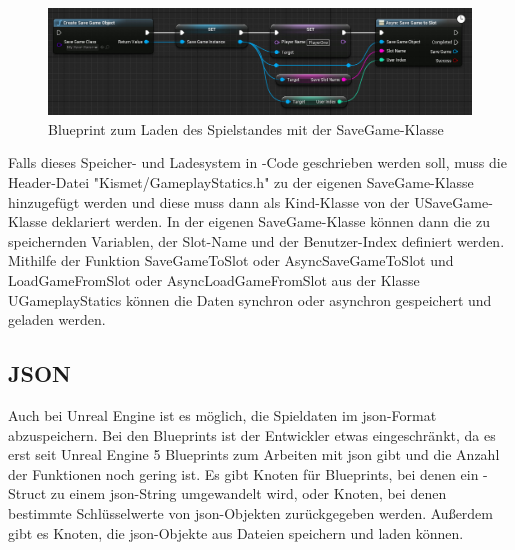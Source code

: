 \begin{figure}[htp]
    \centering
    \includegraphics[width=1\textwidth]{images/SaveGameBP.png}
    \caption{Blueprint zum Laden des Spielstandes mit der SaveGame-Klasse \cite{unrealengineSavingLoading}}
    \label{fig:unrealSaveGameBluePrintLoad}
\end{figure}

Falls dieses Speicher- und Ladesystem in \cpp{}-Code geschrieben werden soll, muss die Header-Datei "Kismet/GameplayStatics.h" zu der eigenen SaveGame-Klasse hinzugefügt werden und diese muss dann als Kind-Klasse von der USaveGame-Klasse deklariert werden. In der eigenen SaveGame-Klasse können dann die zu speichernden Variablen, der Slot-Name und der Benutzer-Index definiert werden. Mithilfe der Funktion SaveGameToSlot oder AsyncSaveGameToSlot und LoadGameFromSlot oder AsyncLoadGameFromSlot aus der Klasse UGameplayStatics können die Daten synchron oder asynchron gespeichert und geladen werden.\cite{unrealengineSavingLoading}



\subsection{JSON}
Auch bei Unreal Engine ist es möglich, die Spieldaten im \ac{json}-Format abzuspeichern. Bei den Blueprints ist der Entwickler etwas eingeschränkt, da es erst seit Unreal Engine 5 Blueprints zum Arbeiten mit \ac{json} gibt und die Anzahl der Funktionen noch gering ist. Es gibt Knoten für Blueprints, bei denen ein \cpp{}-Struct zu einem \ac{json}-String umgewandelt wird, oder Knoten, bei denen bestimmte Schlüsselwerte von \ac{json}-Objekten zurückgegeben werden. Außerdem gibt es Knoten, die \ac{json}-Objekte aus Dateien speichern und laden können.\cite{unrealengineJsonBlueprint}

